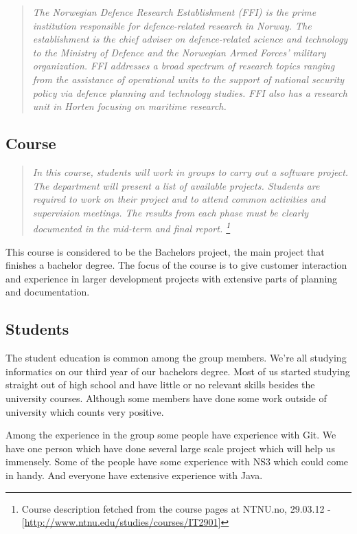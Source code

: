     \begin{quotation}
    \em The Norwegian Defence Research Establishment (FFI) is the prime institution responsible for defence-related research in Norway. The establishment is the chief adviser on defence-related science and technology to the Ministry of Defence and the Norwegian Armed Forces’ military organization. FFI addresses a broad spectrum of research topics ranging from the assistance of operational units to the support of national security policy via defence planning and technology studies. FFI also has a research unit in Horten focusing on maritime research.
    \end{quotation}
    
    \subsection{Course}\label{Course}
    \begin{quotation}
    \em In this course, students will work in groups to carry out a software project. The department will present a list of available projects. Students are required to work on their project and to attend common activities and supervision meetings. The results from each phase must be clearly documented in the mid-term and final report.
    \footnote{Course description fetched from the course pages at NTNU.no, 29.03.12 - [\url{http://www.ntnu.edu/studies/courses/IT2901}]}
    \end{quotation}
    
    This course is considered to be the Bachelors project, the main project that finishes a bachelor degree. The focus of the course is to give customer interaction and experience in larger development projects with extensive parts of planning and documentation. 
    
    
    \subsection{Students}\label{Students}

    The student education is common among the group members. We're all studying informatics on our third year of our bachelors degree. Most of us started studying straight out of high school and have little or no relevant skills besides the university courses. Although some members have done some work outside of university which counts very positive. 
    
    Among the experience in the group some people have experience with Git. We have one person which have done several large scale project which will help us immensely. Some of the people have some experience with NS3 which could come in handy. And everyone have extensive experience with Java.
    
